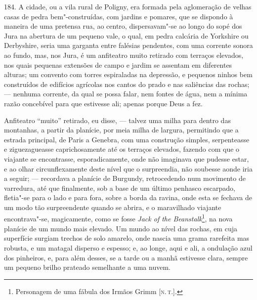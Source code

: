 184. A cidade, ou a vila rural de Poligny, era formada pela aglomeração
de velhas casas de pedra bem"-construídas, com jardins e pomares, que se
dispondo à maneira de uma pretensa rua, ao centro, dispersavam"-se ao
longo do sopé dos Jura na abertura de um pequeno vale, o qual, em pedra
calcária de Yorkshire ou Derbyshire, seria uma garganta entre falésias
pendentes, com uma corrente sonora ao fundo, mas, nos Jura, é um
anfiteatro muito retirado com terraços elevados, nos quais pequenas
extensões de campo e jardim se assentam em diferentes alturas; um
convento com torres espiraladas na depressão, e pequenos ninhos bem
construídos de edifícios agrícolas nos cantos do prado e nas saliências
das rochas; --- nenhuma corrente, da qual se possa falar, nem fontes de
água, nem a mínima razão concebível para que estivesse ali; apenas
porque Deus a fez.

Anfiteatro ``muito'' retirado, eu disse, --- talvez uma milha para dentro
das montanhas, a partir da planície, por meia milha de largura,
permitindo que a estrada principal, de Paris a Genebra, com uma
construção simples, serpenteasse e ziguezagueasse caprichosamente até os
terraços elevados, fazendo com que o viajante se encontrasse,
esporadicamente, onde não imaginava que pudesse estar, e ao olhar
circunflexamente deste nível que o surpreendia, não soubesse aonde iria
a seguir; --- recordava a planície de Burgundy, retrocedendo num
movimento de varredura, até que finalmente, sob a base de um último
penhasco escarpado, fletia"-se para o lado e para fora, sobre a borda da
ravina, onde esta se fechava de um modo tão surpreendente quando se
abrira, e o maravilhado viajante encontrava"-se, magicamente, como se
fosse \emph{Jack of the Beanstalk}\footnote{Personagem de uma fábula dos
  Irmãos Grimm {[}\textsc{n.\,t.}{]}.}, na nova planície de um mundo mais
elevado. Um mundo ao nível das rochas, em cuja superfície surgiam
trechos de solo amarelo, onde nascia uma grama rarefeita mas robusta, e
um matagal disperso e espesso; e, ao longe, aqui e ali, a ondulação azul
dos pinheiros, e, para além desses, se a tarde ou a manhã estivesse
clara, sempre um pequeno brilho prateado semelhante a uma nuvem.

